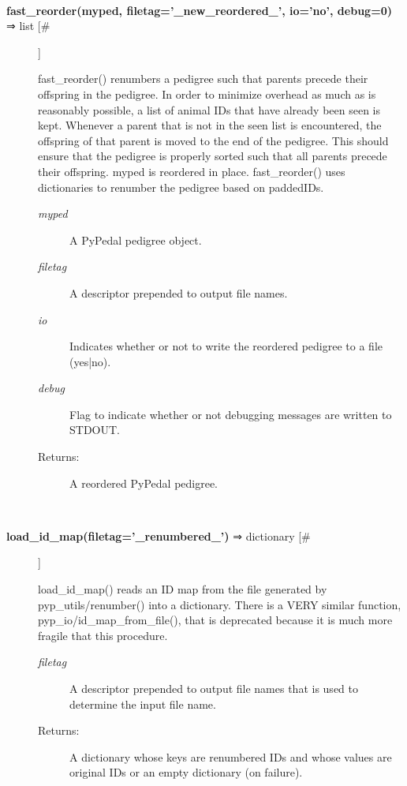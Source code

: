 \documentclass[10pt]{article}
\begin{document}
\begin{description}
\begin{description}
\end{description}
\\ 

\item[\textbf{fast\_reorder(myped, filetag='\_new\_reordered\_', io='no', debug=0)}
 ⇒ list [\#]]

 fast\_reorder() renumbers a pedigree such that parents precede their offspring in the pedigree. In order to minimize overhead as much as is reasonably possible, a list of animal IDs that have already been seen is kept. Whenever a parent that is not in the seen list is encountered, the offspring of that parent is moved to the end of the pedigree. This should ensure that the pedigree is properly sorted such that all parents precede their offspring. myped is reordered in place. fast\_reorder() uses dictionaries to renumber the pedigree based on paddedIDs.
\begin{description}
\item[\emph{myped}
] A PyPedal pedigree object.
\item[\emph{filetag}
] A descriptor prepended to output file names.
\item[\emph{io}
] Indicates whether or not to write the reordered pedigree to a file (yes|no).
\item[\emph{debug}
] Flag to indicate whether or not debugging messages are written to STDOUT.
\item[Returns:] A reordered PyPedal pedigree.

\end{description}
\\ 

\item[\textbf{load\_id\_map(filetag='\_renumbered\_')}
 ⇒ dictionary [\#]]

 load\_id\_map() reads an ID map from the file generated by pyp\_utils/renumber() into a dictionary. There is a VERY similar function, pyp\_io/id\_map\_from\_file(), that is deprecated because it is much more fragile that this procedure.
\begin{description}
\item[\emph{filetag}
] A descriptor prepended to output file names that is used to determine the input file name.
\item[Returns:] A dictionary whose keys are renumbered IDs and whose values are original IDs or an empty dictionary (on failure).

\end{description}
\\ 


\end{description}
\end{document}
